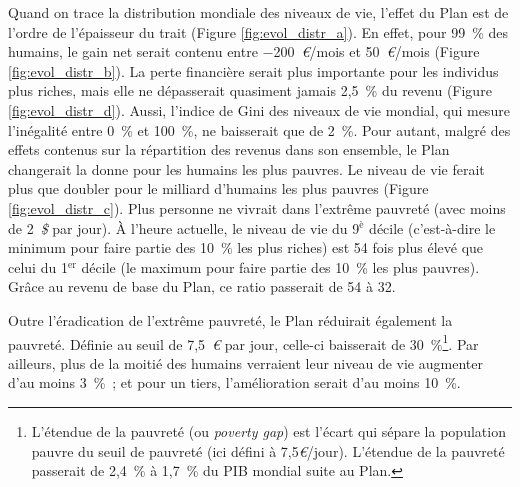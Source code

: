 \documentclass[a5paper,french,openany]{memoir}
\begin{document}


Quand on trace la distribution mondiale des niveaux de vie, l'effet du Plan est de l'ordre de l'épaisseur du trait (Figure \ref{fig:evol_distr_a}). En effet, pour 99~\% des humains, le gain net serait contenu entre $-$200~\textit{\euro{}}/mois et 50~\textit{\euro{}}/mois (Figure \ref{fig:evol_distr_b}). La perte financière serait plus importante pour les individus plus riches, mais elle ne dépasserait quasiment jamais 2,5~\% du revenu (Figure \ref{fig:evol_distr_d}). Aussi, l'indice de Gini des niveaux de vie mondial, qui mesure l'inégalité entre 0~\% et 100~\%, ne baisserait que de 2~\%. 
Pour autant, malgré des effets contenus sur la répartition des revenus dans son ensemble, le Plan changerait la donne pour les humains les plus pauvres. Le niveau de vie ferait plus que doubler pour le milliard d'humains les plus pauvres (Figure \ref{fig:evol_distr_c}). Plus personne ne vivrait dans l'extrême pauvreté (avec moins de 2~\textit{\$} par jour). 
À l'heure actuelle, le niveau de vie du 9$^\text{è}$ décile (c'est-à-dire le minimum pour faire partie des 10~\% les plus riches) est 54 fois plus élevé que celui du 1$^\text{er}$ décile (le maximum pour faire partie des 10~\% les plus pauvres). Grâce au revenu de base du Plan, ce ratio passerait de 54 à 32. 

Outre l'éradication de l'extrême pauvreté, le Plan réduirait également la pauvreté. Définie au seuil de 7,5~\textit{\euro{}} par jour, %
celle-ci baisserait de 30~\%\footnote{L'étendue de la pauvreté (ou \textit{poverty gap}) est l'écart qui sépare la population pauvre du seuil de pauvreté (ici défini à 7,5\textit{\euro{}}/jour). L'étendue de la pauvreté passerait de 2,4~\% à 1,7~\% du PIB mondial suite au Plan.}. 
Par ailleurs, plus de la moitié des humains verraient leur niveau de vie augmenter d'au moins 3~\%~; et pour un tiers, l'amélioration serait d'au moins 10~\%. 
\end{document}
